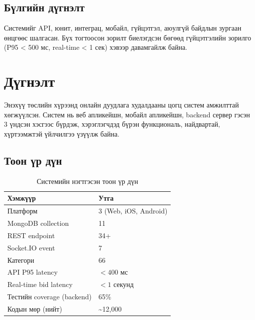 \documentclass[12pt, a4paper]{report}
\begin{document}
\section{Бүлгийн дүгнэлт}

Системийг API, юнит, интеграц, мобайл, гүйцэтгэл, аюулгүй байдлын зургаан өнцгөөс шалгасан. Бүх тогтоосон зорилт биелэгдсэн бөгөөд гүйцэтгэлийн зорилго (P95 < 500 мс, real-time < 1 сек) хэвээр давамгайлж байна.

\chapter*{Дүгнэлт}

Энэхүү төслийн хүрээнд онлайн дуудлага худалдааны цогц систем амжилттай хөгжүүлсэн. Систем нь веб апликейшн, мобайл апликейшн, backend сервер гэсэн 3 үндсэн хэсгээс бүрдэж, хэрэглэгчдэд бүрэн функциональ, найдвартай, хүртээмжтэй үйлчилгээ үзүүлж байна.

\section*{Тоон үр дүн}

\begin{table}[H]
  \centering
  \caption{Системийн нэгтгэсэн тоон үр дүн}
  \label{tab:summary}
  \begin{tabularx}{\textwidth}{L{6cm}L{6cm}}
    \toprule
    \textbf{Хэмжүүр} & \textbf{Утга} \\
    \midrule
    Платформ & 3 (Web, iOS, Android) \\
    MongoDB collection & 11 \\
    REST endpoint & 34+ \\
    Socket.IO event & 7 \\
    Категори & 66 \\
    API P95 latency & $< 400$ мс \\
    Real-time bid latency & $< 1$ секунд \\
    Тестийн coverage (backend) & 65\% \\
    Кодын мөр (нийт) & \textasciitilde12,000 \\
    \bottomrule
  \end{tabularx}
\end{table}
\end{document}
